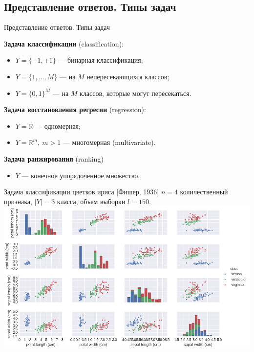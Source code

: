 \documentclass[compress]{beamer}
\begin{document}
\subsection{Представление ответов. Типы задач}
\begin{frame}{Представление ответов. Типы задач}
    
    {\bf Задача классификации} (classification):
    \begin{itemize}
        \item $Y = \{-1, +1\}$ --- бинарная классификация;
        \item $Y = \{1, \dots, M\}$ --- на $M$ непересекающихся классов;
        \item $Y = \{0, 1\}^M$ --- на $M$ классов, которые могут пересекаться.
    \end{itemize}
    \vfill

    {\bf Задача восстановления регресии} (regression):
    \begin{itemize}
        \item $Y = \mathbb{R}$ --- одномерная;
        \item $Y = \mathbb{R}^m, ~ m > 1$ --- многомерная (multivariate).
    \end{itemize}
    \vfill

    {\bf Задача ранжирования} (ranking)
    \begin{itemize}
        \item $Y$ --- конечное упорядоченное множество.
    \end{itemize}
\end{frame}
\begin{frame}{Задача классификации цветков ириса [Фишер, 1936]}
    \footnotesize $n = 4$ количественный признака, $|Y| = 3$ класса, объем выборки $l = 150$.
    \includegraphics[width=\linewidth]{fig/iris.png}
\end{frame}
\end{document}
